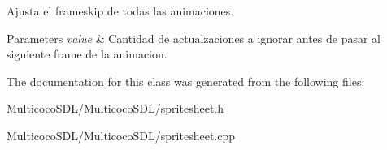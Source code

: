 Ajusta el frameskip de todas las animaciones. 


\begin{DoxyParams}{Parameters}
{\em value} & Cantidad de actualzaciones a ignorar antes de pasar al siguiente frame de la animacion. \\
\hline
\end{DoxyParams}


The documentation for this class was generated from the following files\-:\begin{DoxyCompactItemize}
\item 
Multicoco\-S\-D\-L/\-Multicoco\-S\-D\-L/spritesheet.\-h\item 
Multicoco\-S\-D\-L/\-Multicoco\-S\-D\-L/spritesheet.\-cpp\end{DoxyCompactItemize}
